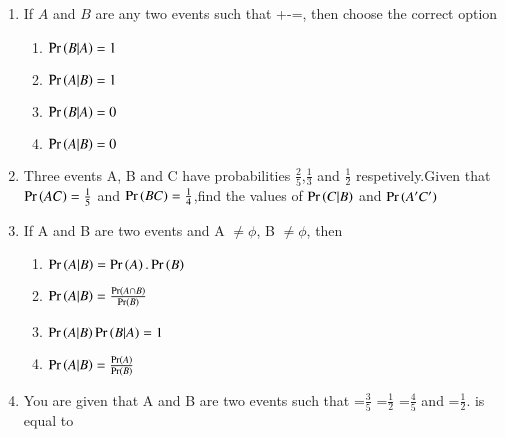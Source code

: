 \begin{enumerate}[label=\thesubsection.\arabic*,ref=\thesubsection.\theenumi]
\solution
%
	\item If $A$ and $B$ are any two events such that +-=, then choose the correct option
\begin{enumerate}
\item  $\Pr\left(B|A\right)=1$
\item $\Pr\left(A|B\right)=1$
	\label{prob:12/13/6/19}
\item $\Pr\left(B|A\right)=0$
\item $\Pr\left(A|B\right)=0$
\end{enumerate}
		\solution
\item Three events A, B and C have probabilities $\frac{2}{5}$,$\frac{1}{3}$ and $\frac{1}{2}$ respetively.Given that $\Pr\left(AC\right)=\frac{1}{5}$ and $\Pr\left(BC\right)=\frac{1}{4}$,find the values of $\Pr\left(C | B\right)$ and $\Pr\left(A^{\prime} C^{\prime}\right)$\\
\solution
%
%
\item If A and B are two events and A $\ne \phi$, B $\ne \phi$, then
\begin{enumerate}
	\item $\Pr\left(A|B\right) = \Pr\left(A\right).\Pr\left(B\right)$
	\item $\Pr\left(A|B\right) = \frac{\Pr\left(A\cap B\right)}{\Pr\left(B\right)}$
	\item $\Pr\left(A|B\right)\Pr\left(B|A\right) = 1$
	\item $\Pr\left(A|B\right) = \frac{\Pr\left(A\right)}{\Pr\left(B\right)}$
\end{enumerate}
\item You are given that A and B are two events such that =$\frac{3}{5}$ =$\frac{1}{2}$ =$\frac{4}{5}$ and =$\frac{1}{2}$.   is equal to
\end{enumerate}
